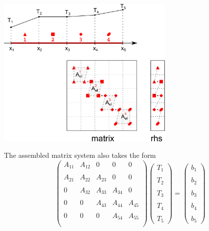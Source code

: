 \begin{center}
\includegraphics[width=8.5cm]{images/oneD/assembly}
\end{center}

The assembled matrix system also takes the form
\[
\left(
\begin{array}{ccccc}
A_{11} & A_{12} & 0& 0& 0\\ \\
A_{21} & A_{22} & A_{23}& 0 & 0\\\\
0 & A_{32} & A_{33}&  A_{34}  & 0\\\\
0&0&   A_{43} & A_{44}&  A_{45} \\\\
0&0&0   & A_{54}&  A_{55} \\\\
\end{array}
\right)
\left(
\begin{array}{c}
T_1 \\\\ T_2 \\\\ T_3 \\\\ T_4 \\\\ T_5
\end{array}
\right)
=
\left(
\begin{array}{c}
b_1\\\\
b_2\\\\
b_3\\\\
b_4\\\\
b_5
\end{array}
\right)
\]

